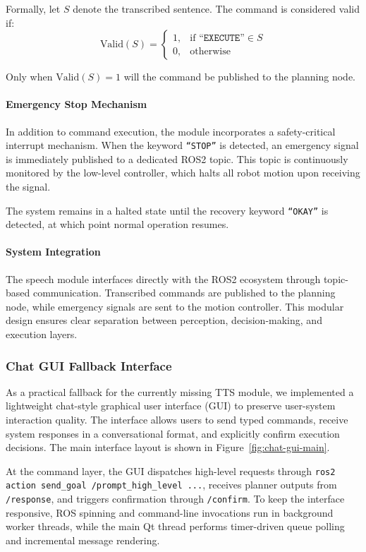 \documentclass[12pt]{extarticle}
\begin{document}
Formally, let $S$ denote the transcribed sentence. The command is considered valid if:
\[
\text{Valid}(S) =
\begin{cases}
1, & \text{if } \texttt{``EXECUTE''} \in S \\
0, & \text{otherwise}
\end{cases}
\]

Only when $\text{Valid}(S) = 1$ will the command be published to the planning node.

\paragraph{Emergency Stop Mechanism}
In addition to command execution, the module incorporates a safety-critical interrupt mechanism. When the keyword \texttt{``STOP''} is detected, an emergency signal is immediately published to a dedicated ROS2 topic. This topic is continuously monitored by the low-level controller, which halts all robot motion upon receiving the signal.

The system remains in a halted state until the recovery keyword \texttt{``OKAY''} is detected, at which point normal operation resumes.

\paragraph{System Integration}
The speech module interfaces directly with the ROS2 ecosystem through topic-based communication. Transcribed commands are published to the planning node, while emergency signals are sent to the motion controller. This modular design ensures clear separation between perception, decision-making, and execution layers.

\subsubsection{Chat GUI Fallback Interface}
As a practical fallback for the currently missing TTS module, we implemented a lightweight chat-style graphical user interface (GUI) to preserve user-system interaction quality. The interface allows users to send typed commands, receive system responses in a conversational format, and explicitly confirm execution decisions. The main interface layout is shown in Figure~\ref{fig:chat-gui-main}.

At the command layer, the GUI dispatches high-level requests through \texttt{ros2 action send\_goal /prompt\_high\_level ...}, receives planner outputs from \texttt{/response}, and triggers confirmation through \texttt{/confirm}. To keep the interface responsive, ROS spinning and command-line invocations run in background worker threads, while the main Qt thread performs timer-driven queue polling and incremental message rendering.
\end{document}

